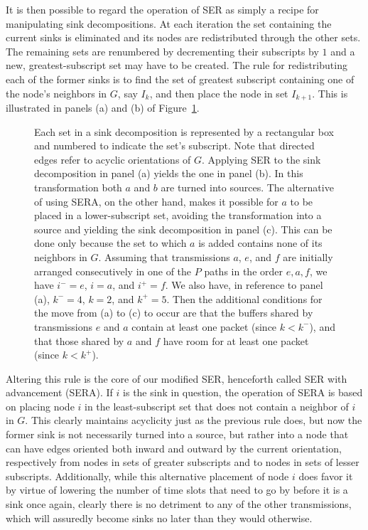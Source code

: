 \documentclass{article}
\begin{document}
It is then possible to regard the operation of SER as simply a recipe for
manipulating sink decompositions. At each iteration the set containing the
current sinks is eliminated and its nodes are redistributed through the other
sets. The remaining sets are renumbered by decrementing their subscripts by $1$
and a new, greatest-subscript set may have to be created. The rule for
redistributing each of the former sinks is to find the set of greatest subscript
containing one of the node's neighbors in $G$, say $I_k$, and then place the
node in set $I_{k+1}$. This is illustrated in panels (a) and (b) of
Figure~\ref{fig6}.

\begin{figure}[t]
\centering
{}
\caption{
Each set in a sink decomposition is represented by a rectangular box and
numbered to indicate the set's subscript. Note that directed edges refer to
acyclic orientations of $G$. Applying SER to the sink decomposition in panel (a)
yields the one in panel (b). In this transformation both $a$ and $b$ are turned
into sources. The alternative of using SERA, on the other hand, makes it
possible for $a$ to be placed in a lower-subscript set, avoiding the
transformation into a source and yielding the sink decomposition in panel (c).
This can be done only because the set to which $a$ is added contains none of its
neighbors in $G$. Assuming that transmissions $a$, $e$, and $f$ are initially
arranged consecutively in one of the $P$ paths in the order $e,a,f$, we have
$i^-=e$, $i=a$, and $i^+=f$. We also have, in reference to panel (a), $k^-=4$,
$k=2$, and $k^+=5$. Then the additional conditions for the move from (a) to (c)
to occur are that the buffers shared by transmissions $e$ and $a$ contain at
least one packet (since $k<k^-$), and that those shared by $a$ and $f$ have room
for at least one packet (since $k<k^+$).}
\label{fig6}
\end{figure}

Altering this rule is the core of our modified SER, henceforth called SER with
advancement (SERA). If $i$ is the sink in question, the operation of SERA is
based on placing node $i$ in the least-subscript set that does not contain a
neighbor of $i$ in $G$. This clearly maintains acyclicity just as the previous
rule does, but now the former sink is not necessarily turned into a source, but
rather into a node that can have edges oriented both inward and outward by the
current orientation, respectively from nodes in sets of greater subscripts and
to nodes in sets of lesser subscripts. Additionally, while this alternative
placement of node $i$ does favor it by virtue of lowering the number of time
slots that need to go by before it is a sink once again, clearly there is no
detriment to any of the other transmissions, which will assuredly become sinks
no later than they would otherwise.
\end{document}
